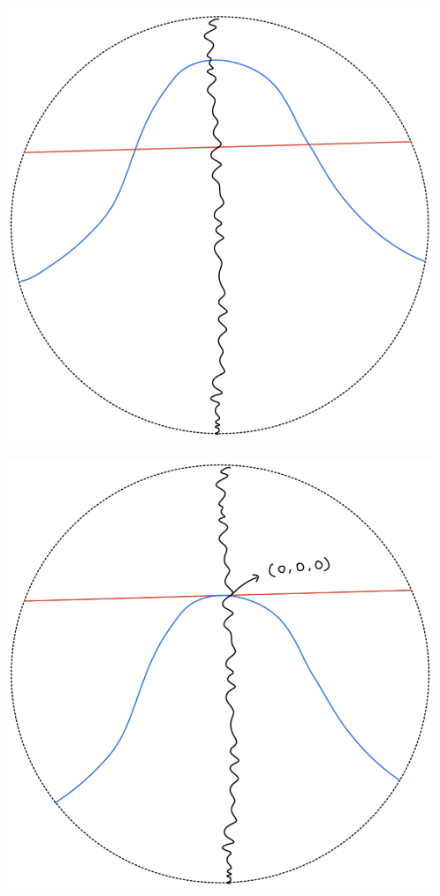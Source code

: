 \begin{definition}
\begin{enumerate}
\begin{itemize}
\begin{figure}[H]
    \centering
    \includegraphics[scale = 0.45]{diagrams/lemma3/16.png} 
    \caption{}
    \label{fig:your-label}
\end{figure}
\begin{figure}[H]
    \centering
    \includegraphics[scale = 0.45]{diagrams/lemma3/17.png} 

\end{figure}
\end{itemize}
\end{enumerate}
\end{definition}
